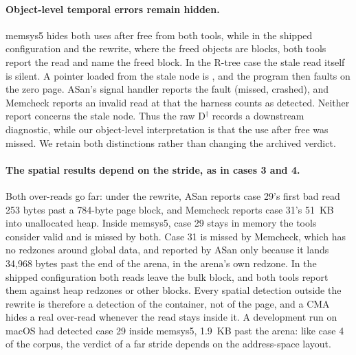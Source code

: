 \begin{table}[!htbp]
\centering\small
\setlength{\tabcolsep}{4.5pt}

\caption{Raw harness verdicts for four real SQLite 3.22.0 bugs on the lab server (). Shipped
= SQLite's default configuration. $\dagger$: Memcheck's report is an invalid read at address  just before the process dies of , the same crash that ASan records as M$^{*}$, and it does not concern the stale node. $\ddagger$: the over-read left its container (the arena or the page cache's bulk block) and is reported against a redzone, a freed block or unallocated heap, never against the page.}
\label{tab:real}
\end{table}

\paragraph{Object-level temporal errors remain hidden.} memsys5 hides both uses after free from both tools, while in the shipped configuration and the rewrite, where the freed objects are  blocks, both tools report the read and name the freed block. In the R-tree case the stale read itself is silent. A pointer loaded from the stale node is , and the program then faults on the zero page. ASan's signal handler reports the fault (missed, crashed), and Memcheck reports an invalid read at  that the harness counts as detected. Neither report concerns the stale node. Thus the raw D$^{\dagger}$ records a downstream diagnostic, while our object-level interpretation is that the use after free was missed. We retain both distinctions rather than changing the archived verdict.

\paragraph{The spatial results depend on the stride, as in cases 3 and 4.} Both over-reads go far: under the rewrite, ASan reports case 29's first bad read 253 bytes past a 784-byte page block, and Memcheck reports case 31's 51~KB into unallocated heap. Inside memsys5, case 29 stays in memory the tools consider valid and is missed by both. Case 31 is missed by Memcheck, which has no redzones around global data, and reported by ASan only because it lands 34{,}968 bytes past the end of the arena, in the arena's own redzone. In the shipped configuration both reads leave the bulk block, and both tools report them against heap redzones or other blocks. Every spatial detection outside the rewrite is therefore a detection of the container, not of the page, and a CMA hides a real over-read whenever the read stays inside it. A development run on macOS had detected case 29 inside memsys5, 1.9~KB past the arena: like case 4 of the corpus, the verdict of a far stride depends on the address-space layout.

